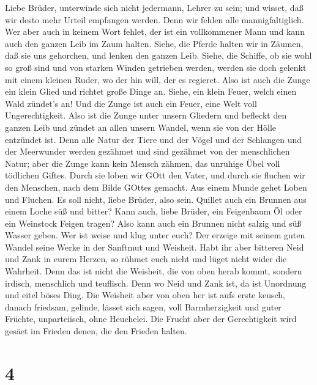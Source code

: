  Liebe Brüder, unterwinde sich nicht jedermann, Lehrer zu
sein; und wisset, daß wir desto mehr Urteil empfangen werden.
 Denn wir fehlen alle mannigfaltiglich. Wer aber auch in
keinem Wort fehlet, der ist ein vollkommener Mann und kann auch den
ganzen Leib im Zaum halten.  Siehe, die Pferde halten wir in
Zäumen, daß sie uns gehorchen, und lenken den ganzen Leib. 
Siehe, die Schiffe, ob sie wohl so groß sind und von starken Winden
getrieben werden, werden sie doch gelenkt mit einem kleinen Ruder, wo
der hin will, der es regieret.  Also ist auch die Zunge ein
klein Glied und richtet große Dinge an. Siehe, ein klein Feuer, welch
einen Wald zündet's an!  Und die Zunge ist auch ein Feuer,
eine Welt voll Ungerechtigkeit. Also ist die Zunge unter unsern Gliedern
und befleckt den ganzen Leib und zündet an allen unsern Wandel, wenn sie
von der Hölle entzündet ist.  Denn alle Natur der Tiere und
der Vögel und der Schlangen und der Meerwunder werden gezähmet und sind
gezähmet von der menschlichen Natur;  aber die Zunge kann
kein Mensch zähmen, das unruhige Übel voll tödlichen Giftes.
 Durch sie loben wir GOtt den Vater, und durch sie fluchen
wir den Menschen, nach dem Bilde GOttes gemacht.  Aus einem
Munde gehet Loben und Fluchen. Es soll nicht, liebe Brüder, also sein.
 Quillet auch ein Brunnen aus einem Loche süß und bitter?
 Kann auch, liebe Brüder, ein Feigenbaum Öl oder ein
Weinstock Feigen tragen? Also kann auch ein Brunnen nicht salzig und süß
Wasser geben.  Wer ist weise und klug unter euch? Der
erzeige mit seinem guten Wandel seine Werke in der Sanftmut und
Weisheit.  Habt ihr aber bitteren Neid und Zank in eurem
Herzen, so rühmet euch nicht und lüget nicht wider die Wahrheit.
 Denn das ist nicht die Weisheit, die von oben herab kommt,
sondern irdisch, menschlich und teuflisch.  Denn wo Neid
und Zank ist, da ist Unordnung und eitel böses Ding.  Die
Weisheit aber von oben her ist aufs erste keusch, danach friedsam,
gelinde, lässet sich sagen, voll Barmherzigkeit und guter Früchte,
unparteiisch, ohne Heuchelei.  Die Frucht aber der
Gerechtigkeit wird gesäet im Frieden denen, die den Frieden halten.

\hypertarget{section-3}{%
\section{4}\label{section-3}}

